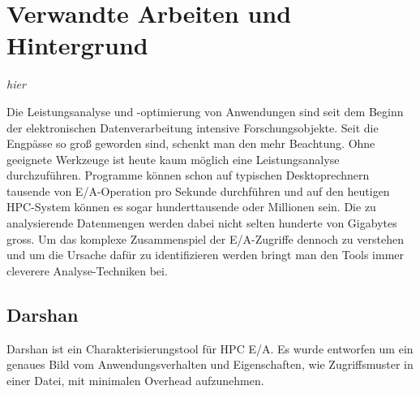 

\newpage

\section{Verwandte Arbeiten und Hintergrund}
\textit{hier}




Die Leistungsanalyse und -optimierung von Anwendungen sind seit dem Beginn der elektronischen Datenverarbeitung intensive Forschungsobjekte. 
Seit die Engpässe  so groß geworden sind, schenkt man den mehr Beachtung. 
Ohne geeignete Werkzeuge ist heute kaum möglich eine Leistungsanalyse durchzuführen. 
Programme können schon auf typischen Desktoprechnern tausende von E/A-Operation pro Sekunde durchführen und auf den heutigen HPC-System können es sogar hunderttausende oder Millionen sein. 
Die zu analysierende Datenmengen werden dabei nicht selten hunderte von Gigabytes gross. 
Um das komplexe Zusammenspiel der E/A-Zugriffe dennoch zu verstehen und um die Ursache dafür zu identifizieren werden bringt man den Tools immer cleverere Analyse-Techniken bei.


\subsection{Darshan}
Darshan ist ein Charakterisierungstool für HPC E/A.
Es wurde entworfen um ein genaues Bild vom Anwendungsverhalten und Eigenschaften, wie Zugriffsmuster in einer Datei, mit minimalen  Overhead aufzunehmen.

